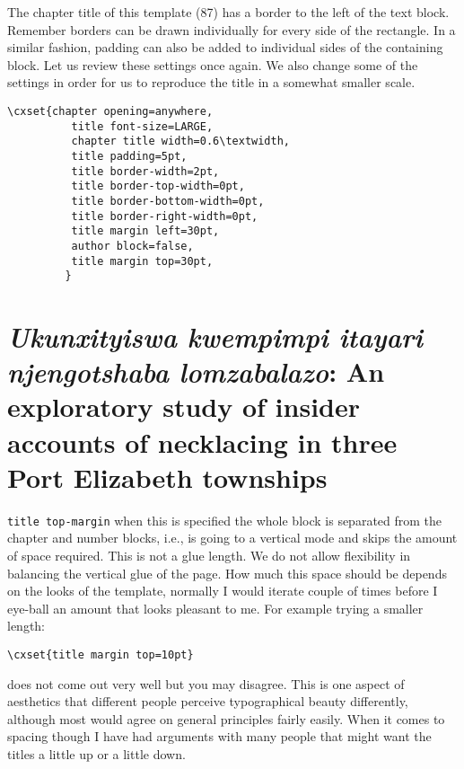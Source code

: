 The chapter title of this template (87) has a border to the left of the text block. Remember borders can be drawn individually for every side of the rectangle. In a similar fashion, padding can also be added to individual sides of the containing block. Let us review these settings once again. We also change some of the settings
in order for us to reproduce the title in a somewhat smaller scale.

\begin{verbatim}
\cxset{chapter opening=anywhere,
          title font-size=LARGE,
          chapter title width=0.6\textwidth,
          title padding=5pt,
          title border-width=2pt,
          title border-top-width=0pt,
          title border-bottom-width=0pt,
          title border-right-width=0pt,
          title margin left=30pt,
          author block=false,
          title margin top=30pt,
         }
\end{verbatim}

\chapter[Template 87]{{\itshape Ukunxityiswa kwempimpi itayari
                                 njengotshaba lomzabalazo}: An
                                 exploratory study of insider
                                 accounts of necklacing in three
                                 Port Elizabeth townships}

\texttt{title top-margin} when this is specified the whole block is separated from the chapter and number blocks, i.e., \tex is going to a vertical mode and skips the amount of space required. This is not a glue length. We do not allow flexibility in balancing the vertical glue of the page. How much this space should be depends on the looks of
the template, normally I would iterate  couple of times before I eye-ball an amount that looks pleasant to me.
For example trying a smaller length:
\begin{verbatim}
\cxset{title margin top=10pt}
\end{verbatim}
does not come out very well but you may disagree. This is one aspect of aesthetics that different people perceive typographical beauty differently, although most would agree on general principles fairly easily. When it comes to spacing though I have had arguments with many people that might want the titles a little up or a little down.

